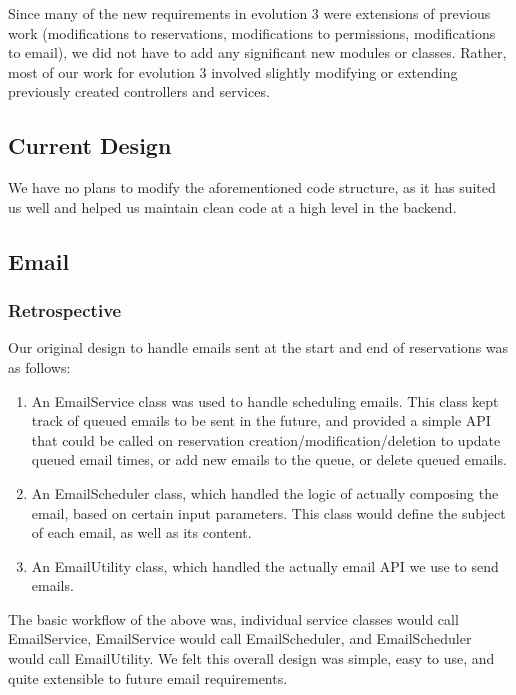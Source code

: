 \documentclass[12pt]{article}
\begin{document}
Since many of the new requirements in evolution 3 were extensions of previous work (modifications to reservations, modifications to permissions, modifications to email), we did not have to add any significant new modules or classes. Rather, most of our work for evolution 3 involved slightly modifying or extending previously created controllers and services. 

\subsection{Current Design}
We have no plans to modify the aforementioned code structure, as it has suited us well and helped us maintain clean code at a high level in the backend. 


\subsection{Email}
\label{sec:EMAIL}
\subsubsection{Retrospective}
Our original design to handle emails sent at the start and end of reservations was as follows:
\begin{enumerate}
    \item An EmailService class was used to handle scheduling emails. This class kept track of queued emails to be sent in the future, and provided a simple API that could be called on reservation creation/modification/deletion to update queued email times, or add new emails to the queue, or delete queued emails.
    \item An EmailScheduler class, which handled the logic of actually composing the email, based on certain input parameters. This class would define the subject of each email, as well as its content. 
    \item An EmailUtility class, which handled the actually email API we use to send emails. 
\end{enumerate}

The basic workflow of the above was, individual service classes would call EmailService, EmailService would call EmailScheduler, and EmailScheduler would call EmailUtility. We felt this overall design was simple, easy to use, and quite extensible to future email requirements. 
\end{document}
